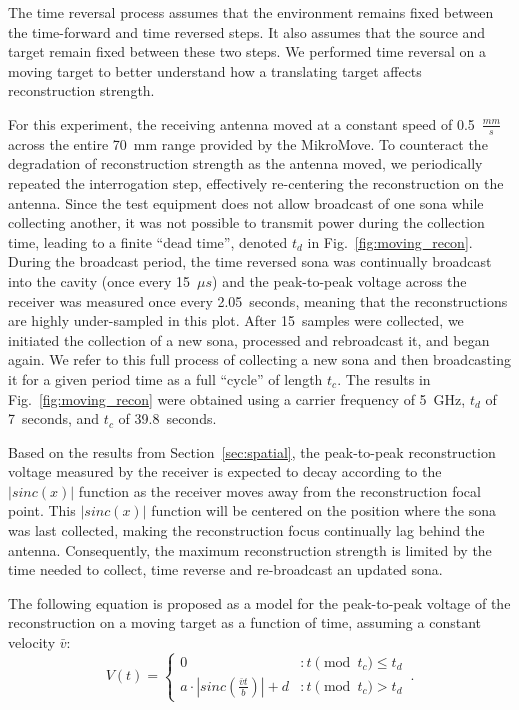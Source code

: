 The time reversal process assumes that the environment remains fixed between the
time-forward and time reversed steps.
%
It also assumes that the source and target remain fixed between these two steps.
%
We performed time reversal on a moving target to better understand how a
translating target affects reconstruction strength.



For this experiment, the receiving antenna moved at a constant speed of
0.5~$\frac{mm}{s}$ across the entire 70~mm range provided by the MikroMove.
%
To counteract the degradation of reconstruction strength as the antenna moved,
we periodically repeated the interrogation step, effectively re-centering the
reconstruction on the antenna.
%
Since the test equipment does not allow broadcast of one sona while collecting
another, it was not possible to transmit power during the collection time,
leading to a finite ``dead time'', denoted $t_d$ in Fig.~\ref{fig:moving_recon}.
%
During the broadcast period, the time reversed sona was continually broadcast
into the cavity (once every 15~$\mu s$) and the peak-to-peak voltage across the
receiver was measured once every 2.05~seconds, meaning that the reconstructions
are highly under-sampled in this plot.
%
After 15~samples were collected, we initiated the collection of a new sona, processed and rebroadcast it, and
began again. We refer to this full process of collecting a new sona and
then broadcasting it for a given period time as a full ``cycle'' of length
$t_c$.
%
The results in Fig.~\ref{fig:moving_recon} were obtained using a carrier
frequency of 5~GHz, $t_d$ of 7~seconds, and $t_c$ of 39.8~seconds.



Based on the results from Section~\ref{sec:spatial}, the peak-to-peak
reconstruction voltage measured by the receiver is expected to decay according
to the $\left|sinc(x)\right|$ function as the receiver moves away from the
reconstruction focal point.
%
This $\left|sinc(x)\right|$ function will be centered on the position where the sona
was last collected, making the reconstruction focus continually lag behind the
antenna.
%
Consequently, the maximum reconstruction strength is limited by the time needed
to collect, time reverse and re-broadcast an updated sona.



The following equation is proposed as a model for the peak-to-peak voltage of
the reconstruction on a moving target as a function of time, assuming a constant
velocity $\bar{v}$:
%
\begin{equation}\label{eq:vt}
  V(t) = \left\{
        \begin{array}{lr}
                0 & : t\pmod{t_c} \le t_d \\
                a\cdot \left|sinc\left(\frac{\bar{v}t}{b}\right)\right|+d & : t\pmod{t_c} > t_d
        \end{array}\,.
  \right.
\end{equation}



